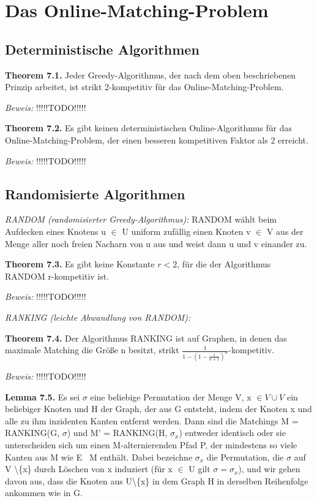 {\chapter{Das Online-Matching-Problem}

\section{Deterministische Algorithmen}

\textbf{Theorem 7.1.} Jeder Greedy-Algorithmus, der nach dem oben beschriebenen Prinzip arbeitet, ist strikt 2-kompetitiv für das Online-Matching-Problem.

\textit{Beweis:} !!!!!TODO!!!!!

\textbf{Theorem 7.2.} Es gibt keinen deterministischen Online-Algorithmus für das Online-Matching-Problem, der einen besseren kompetitiven Faktor als 2 erreicht.

\textit{Beweis:} !!!!!TODO!!!!!

\section{Randomisierte Algorithmen}

\textit{RANDOM (randomisierter Greedy-Algorithmus):} RANDOM wählt beim Aufdecken eines Knotens u $\in$ U uniform zufällig einen Knoten v $\in$ V aus der Menge aller noch freien Nacharn von u aus und weist dann u und v einander zu.

\textbf{Theorem 7.3.} Es gibt keine Konstante $r < 2$, für die der Algorithmus RANDOM r-kompetitiv ist.

\textit{Beweis:} !!!!!TODO!!!!!

\textit{RANKING (leichte Abwandlung von RANDOM):}

\textbf{Theorem 7.4.} Der Algorithmus RANKING ist auf Graphen, in denen das maximale Matching die Größe n besitzt, strikt $\tfrac{1}{1-(1-\tfrac{1}{n+1})^{n}}$-kompetitiv.

\textit{Beweis:} !!!!!TODO!!!!!

\textbf{Lemma 7.5.} Es sei $\sigma$ eine beliebige Permutation der Menge V, x $\in V \cup V$ ein beliebiger Knoten und H der Graph, der aus G entsteht, indem der Knoten x und alle zu ihm inzidenten Kanten entfernt werden. Dann sind die Matchings M = RANKING(G, $\sigma$) und M' = RANKING(H, $\sigma_{x}$) entweder identisch oder sie unterscheiden sich um einen M-alternierenden Pfad P, der mindestens so viele Kanten aus M wie E \ M enthält. Dabei bezeichne $\sigma_{x}$ die Permutation, die $\sigma$ auf V \textbackslash \{x\} durch Löschen von x induziert (für x $\in$ U gilt $\sigma = \sigma_{x}$), und wir gehen davon aus, dass die Knoten aus U\textbackslash \{x\} in dem Graph H in derselben Reihenfolge ankommen wie in G.

}
